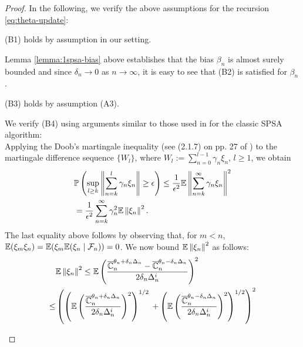 \begin{proof}
In the following, we verify the above assumptions for the recursion \eqref{eq:theta-update}:\\
\begin{inparaenum}[$\bullet$]
\item (B1) holds by assumption in our setting.\\
\item Lemma \ref{lemma:1spsa-bias} above establishes that the bias $\beta_n$ is almost surely bounded and since $\delta_n \rightarrow 0$ as $n\rightarrow \infty$, it is easy to see that (B2) is satisfied for $\beta_n$. \\
\item (B3) holds by assumption (A3).\\
\item We verify (B4) using arguments similar to those used in \cite{spall} for the classic SPSA algorithm:\\
Applying the Doob's martingale inequality (see (2.1.7) on pp. 27 of \cite{kushner-clark}) to the martingale difference sequence $\{W_l\}$, where  $W_l := \sum_{n=0}^{l-1} \gamma_n \xi_n$, $l\ge 1$, we obtain
\begin{align}
&\mathbb{P}\left(  \sup_{l\geq k}   \left\|\sum_{n=k}^{l} \gamma_n \xi_n\right\| \geq \epsilon  \right) \le \dfrac{1}{\epsilon^2} \mathbb{E} \left\|
\sum_{n=k}^{\infty} \gamma_n \xi_n\right\|^2 \nonumber\\
&= \dfrac{1}{\epsilon^2} \sum_{n=k}^{\infty} \gamma_n^2 \mathbb{E}\left\| \xi_n\right\|^2. \label{eq:b4}
\end{align}
The last equality above follows by observing that, for $m < n$, $\mathbb{E}(\xi_m \xi_n) = \mathbb{E}(\xi_m \mathbb{E}(\xi_n\mid \mathcal{F}_n))=0$.
We now bound $\mathbb{E}\left\| \xi_n\right\|^2$ as follows:
\begin{align}
&\E\left\| \xi_n\right\|^2\le \E\left(\dfrac{\overline \C_n^{\theta_n + \delta_n \Delta_n} -\overline \C_n^{\theta_n - \delta_n \Delta_n}}{2 \delta_n \Delta_n^i}\right)^2 \label{eq:mi}\\
\le &\left(\left(\E\left(\dfrac{\overline \C_n^{\theta_n + \delta_n \Delta_n}}{2 \delta_n \Delta_n^i}\right)^2\right)^{1/2}\right. 
\left.+ \left(\E\left(\dfrac{\overline \C_n^{\theta_n - \delta_n \Delta_n}}{2 \delta_n \Delta_n^i}\right)^2\right)^{1/2}\right)^2 \label{eq:minko}\\

\end{align}
\end{inparaenum}
\end{proof}
